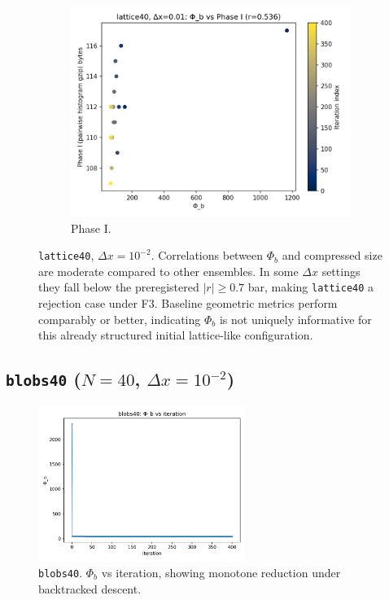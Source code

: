 \documentclass[11pt,a4paper]{article}
\numberwithin{equation}{section}
\newcommand{\phib}{\Phi_b}
\begin{document}
\begin{figure}[h!]
\begin{subfigure}[b]{0.32\textwidth}
\includegraphics[width=\textwidth]{figures/lattice40_dx0.01_phib_vs_phase1.png}
\caption{Phase I.}
\end{subfigure}
\caption{\texttt{lattice40}, $\Delta x{=}10^{-2}$. Correlations between $\phib$ and compressed size are moderate compared to other ensembles. In some $\Delta x$ settings they fall below the preregistered $|r|\ge0.7$ bar, making \texttt{lattice40} a rejection case under F3. Baseline geometric metrics perform comparably or better, indicating $\phib$ is not uniquely informative for this already structured initial lattice-like configuration.}
\label{fig:lattice40_corr}
\end{figure}

\subsection{\texttt{blobs40} ($N{=}40$, $\Delta x = 10^{-2}$)}
\begin{figure}[h!]
\centering
\includegraphics[width=0.6\textwidth]{figures/blobs40_dx0.01_phib_vs_iter.png}
\caption{\texttt{blobs40}. $\phib$ vs iteration, showing monotone reduction under backtracked descent.}
\label{fig:blobs40_iter}
\end{figure}
\end{document}
